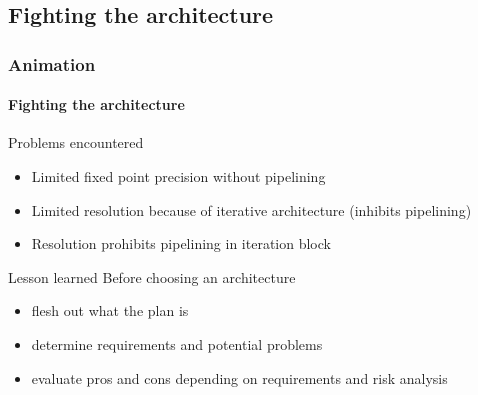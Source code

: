 \documentclass{beamer}
\begin{document}
\subsection{Fighting the architecture}
\begin{frame}
    \frametitle{Animation}
    \framesubtitle{Fighting the architecture}
    \begin{block}{Problems encountered}
        \begin{itemize}
            \item Limited fixed point precision without pipelining
            \item Limited resolution because of iterative architecture (inhibits pipelining)
            \item Resolution prohibits pipelining in iteration block
        \end{itemize}
    \end{block}

    \begin{exampleblock}{Lesson learned}
        Before choosing an architecture
        \begin{itemize}
            \item flesh out what the plan is
            \item determine requirements and potential problems
            \item evaluate pros and cons depending on requirements and risk analysis
        \end{itemize}
    \end{exampleblock}

\end{frame}
\end{document}
